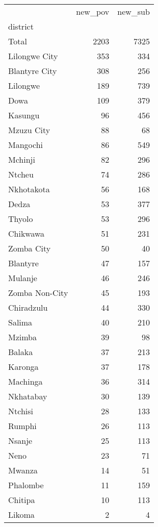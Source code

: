 \begin{tabular}{lrr}
\toprule
{} &  new\_pov &  new\_sub \\
district       &          &          \\
\midrule
Total          &     2203 &     7325 \\
Lilongwe City  &      353 &      334 \\
Blantyre City  &      308 &      256 \\
Lilongwe       &      189 &      739 \\
Dowa           &      109 &      379 \\
Kasungu        &       96 &      456 \\
Mzuzu City     &       88 &       68 \\
Mangochi       &       86 &      549 \\
Mchinji        &       82 &      296 \\
Ntcheu         &       74 &      286 \\
Nkhotakota     &       56 &      168 \\
Dedza          &       53 &      377 \\
Thyolo         &       53 &      296 \\
Chikwawa       &       51 &      231 \\
Zomba City     &       50 &       40 \\
Blantyre       &       47 &      157 \\
Mulanje        &       46 &      246 \\
Zomba Non-City &       45 &      193 \\
Chiradzulu     &       44 &      330 \\
Salima         &       40 &      210 \\
Mzimba         &       39 &       98 \\
Balaka         &       37 &      213 \\
Karonga        &       37 &      178 \\
Machinga       &       36 &      314 \\
Nkhatabay      &       30 &      139 \\
Ntchisi        &       28 &      133 \\
Rumphi         &       26 &      113 \\
Nsanje         &       25 &      113 \\
Neno           &       23 &       71 \\
Mwanza         &       14 &       51 \\
Phalombe       &       11 &      159 \\
Chitipa        &       10 &      113 \\
Likoma         &        2 &        4 \\
\bottomrule
\end{tabular}
